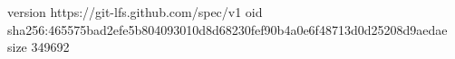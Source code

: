 version https://git-lfs.github.com/spec/v1
oid sha256:465575bad2efe5b804093010d8d68230fef90b4a0e6f48713d0d25208d9aedae
size 349692
